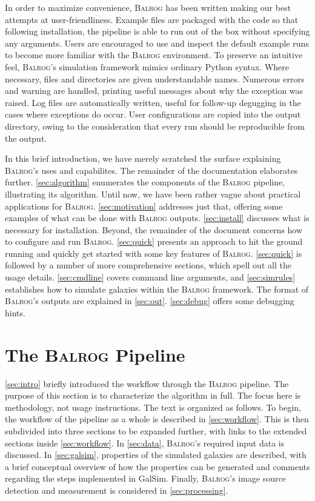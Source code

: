 \documentclass[12pt]{book}
\newcommand{\py}{Python}
\newcommand{\galsim}{GalSim}
\newcommand{\balrog}{\textsc{Balrog}}
\begin{document}
In order to maximize convenience,
\balrog{} has been written making our best attempts at user-friendliness.
Example files are packaged with the code so that following installation,
the pipeline is able to run out of the box without specifying any arguments.
Users are encouraged to use and inspect the default example runs 
to become more familiar with the \balrog{} environment.
To preserve an intuitive feel, \balrog{}'s simulation framework mimics ordinary \py{} syntax. 
Where necessary, files and directories are given understandable names.
Numerous errors and warning are handled, printing useful messages
about why the exception was raised.
Log files are automatically written, useful for follow-up degugging
in the cases where exceptions do occur. User configurations are copied into
the output directory, owing to the consideration that every run should be
reproducible from the output.

In this brief introduction, we have merely scratched the surface explaining \balrog{}'s
uses and capabilites. The remainder of the documentation elaborates further.
\autoref{sec:algorithm} enumerates the components of the \balrog{} pipeline, illustrating its algorithm.
Until now, we have been rather vague about practical applications for \balrog{}.
\autoref{sec:motivation} addresses just that, offering some examples of what can be done with \balrog{} outputs.
\autoref{sec:install} discusses what is necessary for installation.
Beyond, the remainder of the document concerns how to configure and run \balrog{}.
\autoref{sec:quick} presents an approach to hit the ground running and quickly get
started with some key features of \balrog{}.
\autoref{sec:quick} is followed by a number of more comprehensive sections,
which spell out all the usage details.
\autoref{sec:cmdline} covers command line arguments, and
\autoref{sec:simrules} establishes how to simulate galaxies within the \balrog{} framework.
The format of \balrog{}'s outputs are explained in \autoref{sec:out}.
\autoref{sec:debug} offers some debugging hints.


\chapter{The \balrog{} Pipeline}
\label{sec:algorithm}

\autoref{sec:intro} briefly introduced the workflow through the \balrog{} pipeline.
The purpose of this section is to characterize the algorithm in full.
The focus here is methodology, not usage instructions. 
The text is organized as follows.
To begin, the workflow of the pipeline as a whole is described in \autoref{sec:workflow}.
This is then subdivided into three sections to be expanded further,
with links to the extended sections inside \autoref{sec:workflow}.
In \autoref{sec:data}, \balrog{}'s required input data is discussed.
In \autoref{sec:galsim}, properties of the simulated galaxies are described,
with a brief conceptual overview of how the properties can be generated
and comments regarding the steps implemented in \galsim{}.
Finally, \balrog{}'s image source detection and measurement is considered in \autoref{sec:processing}.
\end{document}
